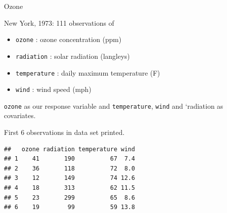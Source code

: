 \documentclass[10pt,ignorenonframetext,]{beamer}
\providecommand{\tightlist}{%
  \setlength{\itemsep}{0pt}\setlength{\parskip}{0pt}}
\begin{document}
\begin{frame}[fragile]

\begin{block}{Ozone}

New York, 1973: 111 observations of

\begin{itemize}
\tightlist
\item
  \texttt{ozone} : ozone concentration (ppm)
\item
  \texttt{radiation} : solar radiation (langleys)
\item
  \texttt{temperature} : daily maximum temperature (F)
\item
  \texttt{wind} : wind speed (mph)
\end{itemize}

\texttt{ozone} as our response variable and \texttt{temperature},
\texttt{wind} and `radiation as covariates.

First 6 observations in data set printed.

\end{block}

\end{frame}

\begin{frame}[fragile]

\begin{verbatim}
##   ozone radiation temperature wind
## 1    41       190          67  7.4
## 2    36       118          72  8.0
## 3    12       149          74 12.6
## 4    18       313          62 11.5
## 5    23       299          65  8.6
## 6    19        99          59 13.8
\end{verbatim}

\end{frame}
\end{document}
